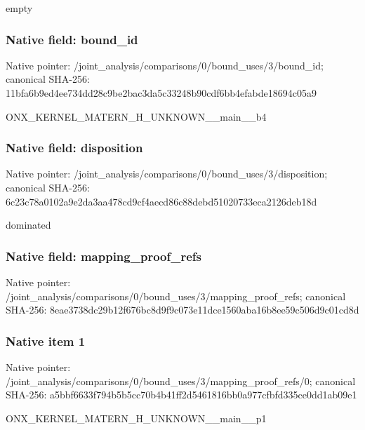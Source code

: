 \documentclass[10pt,a4paper]{article}
\begin{document}
\begingroup\raggedright\sloppy empty\par\endgroup

\subsubsection{Native field: bound\_\allowbreak{}id}
Native pointer: /joint\_\allowbreak{}analysis/comparisons/0/bound\_\allowbreak{}uses/3/bound\_\allowbreak{}id; canonical SHA-256: 11bfa6b9ed4ee734dd28c9be2bac3da5c33248b90cdf6bb4efabde18694c05a9

\begingroup\raggedright\sloppy ONX\_\allowbreak{}KERNEL\_\allowbreak{}MATERN\_\allowbreak{}H\_\allowbreak{}UNKNOWN\_\allowbreak{}\_\allowbreak{}main\_\allowbreak{}\_\allowbreak{}b4\par\endgroup

\subsubsection{Native field: disposition}
Native pointer: /joint\_\allowbreak{}analysis/comparisons/0/bound\_\allowbreak{}uses/3/disposition; canonical SHA-256: 6c23c78a0102a9e2da3aa478cd9cf4aecd86c88debd51020733eca2126deb18d

\begingroup\raggedright\sloppy dominated\par\endgroup

\subsubsection{Native field: mapping\_\allowbreak{}proof\_\allowbreak{}refs}
Native pointer: /joint\_\allowbreak{}analysis/comparisons/0/bound\_\allowbreak{}uses/3/mapping\_\allowbreak{}proof\_\allowbreak{}refs; canonical SHA-256: 8eae3738dc29b12f676bc8d9f9c073e11dce1560aba16b8ee59c506d9c01cd8d

\subsubsection{Native item 1}
Native pointer: /joint\_\allowbreak{}analysis/comparisons/0/bound\_\allowbreak{}uses/3/mapping\_\allowbreak{}proof\_\allowbreak{}refs/0; canonical SHA-256: a5bbf6633f794b5b5cc70b4b41ff2d5461816bb0a977cfbfd335ce0dd1ab09e1

\begingroup\raggedright\sloppy ONX\_\allowbreak{}KERNEL\_\allowbreak{}MATERN\_\allowbreak{}H\_\allowbreak{}UNKNOWN\_\allowbreak{}\_\allowbreak{}main\_\allowbreak{}\_\allowbreak{}p1\par\endgroup
\end{document}
